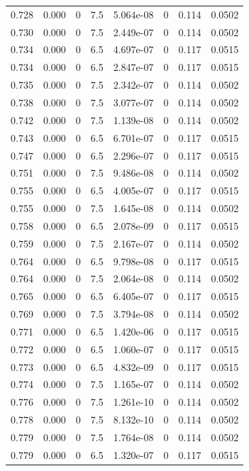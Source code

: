 \documentclass[preview]{standalone}
\begin{document}
{{{{{{{{{\begin{tabular}{L{1.2cm}C{1.2cm} C{0.3cm}C{0.5cm} C{1.4cm}C{1.4cm} C{1.4cm}C{1.4cm}}
  0.728  &  0.000  & 0     & 7.5 &  5.064e-08  & 0  & 0.114 &  0.0502   \\ 
  0.730  &  0.000  & 0     & 7.5 &  2.449e-07  & 0  & 0.114 &  0.0502   \\ 
  0.734  &  0.000  & 0     & 6.5 &  4.697e-07  & 0  & 0.117 &  0.0515   \\ 
  0.734  &  0.000  & 0     & 6.5 &  2.847e-07  & 0  & 0.117 &  0.0515   \\ 
  0.735  &  0.000  & 0     & 7.5 &  2.342e-07  & 0  & 0.114 &  0.0502   \\ 
  0.738  &  0.000  & 0     & 7.5 &  3.077e-07  & 0  & 0.114 &  0.0502   \\ 
  0.742  &  0.000  & 0     & 7.5 &  1.139e-08  & 0  & 0.114 &  0.0502   \\ 
  0.743  &  0.000  & 0     & 6.5 &  6.701e-07  & 0  & 0.117 &  0.0515   \\ 
  0.747  &  0.000  & 0     & 6.5 &  2.296e-07  & 0  & 0.117 &  0.0515   \\ 
  0.751  &  0.000  & 0     & 7.5 &  9.486e-08  & 0  & 0.114 &  0.0502   \\ 
  0.755  &  0.000  & 0     & 6.5 &  4.005e-07  & 0  & 0.117 &  0.0515   \\ 
  0.755  &  0.000  & 0     & 7.5 &  1.645e-08  & 0  & 0.114 &  0.0502   \\ 
  0.758  &  0.000  & 0     & 6.5 &  2.078e-09  & 0  & 0.117 &  0.0515   \\ 
  0.759  &  0.000  & 0     & 7.5 &  2.167e-07  & 0  & 0.114 &  0.0502   \\ 
  0.764  &  0.000  & 0     & 6.5 &  9.798e-08  & 0  & 0.117 &  0.0515   \\ 
  0.764  &  0.000  & 0     & 7.5 &  2.064e-08  & 0  & 0.114 &  0.0502   \\ 
  0.765  &  0.000  & 0     & 6.5 &  6.405e-07  & 0  & 0.117 &  0.0515   \\ 
  0.769  &  0.000  & 0     & 7.5 &  3.794e-08  & 0  & 0.114 &  0.0502   \\ 
  0.771  &  0.000  & 0     & 6.5 &  1.420e-06  & 0  & 0.117 &  0.0515   \\ 
  0.772  &  0.000  & 0     & 6.5 &  1.060e-07  & 0  & 0.117 &  0.0515   \\ 
  0.773  &  0.000  & 0     & 6.5 &  4.832e-09  & 0  & 0.117 &  0.0515   \\ 
  0.774  &  0.000  & 0     & 7.5 &  1.165e-07  & 0  & 0.114 &  0.0502   \\ 
  0.776  &  0.000  & 0     & 7.5 &  1.261e-10  & 0  & 0.114 &  0.0502   \\ 
  0.778  &  0.000  & 0     & 7.5 &  8.132e-10  & 0  & 0.114 &  0.0502   \\ 
  0.779  &  0.000  & 0     & 7.5 &  1.764e-08  & 0  & 0.114 &  0.0502   \\ 
  0.779  &  0.000  & 0     & 6.5 &  1.320e-07  & 0  & 0.117 &  0.0515   \\ 
\hline 
\end{tabular} 

}}}}}}}}}
\end{document}
